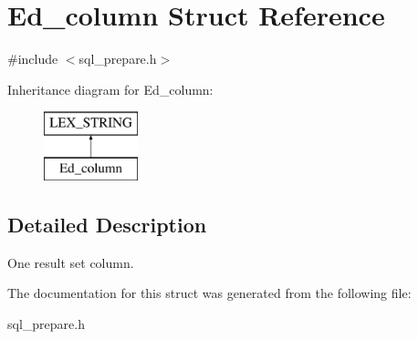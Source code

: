 \hypertarget{structEd__column}{}\section{Ed\+\_\+column Struct Reference}
\label{structEd__column}


{\ttfamily \#include $<$sql\+\_\+prepare.\+h$>$}

Inheritance diagram for Ed\+\_\+column\+:\begin{figure}[H]
\begin{center}
\leavevmode
\includegraphics[height=2.000000cm]{structEd__column}
\end{center}
\end{figure}


\subsection{Detailed Description}
One result set column. 

The documentation for this struct was generated from the following file\+:\begin{DoxyCompactItemize}
\item 
sql\+\_\+prepare.\+h\end{DoxyCompactItemize}
